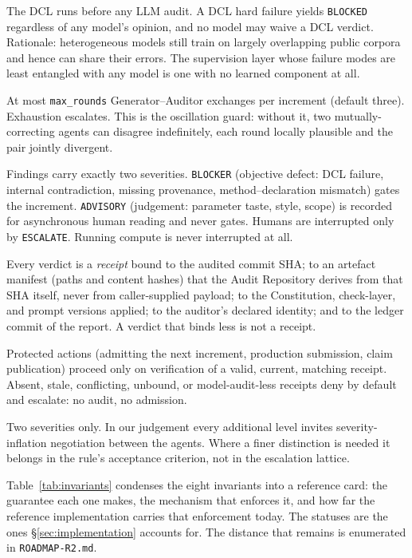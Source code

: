 \documentclass[11pt,letterpaper]{article}
\newcommand{\invariant}[1]{\textbf{I#1}}
\begin{document}
\begin{description}[itemsep=2pt,topsep=3pt]
  \item[\invariant{4} --- Determinism first.] The DCL runs before any LLM audit. A DCL hard failure yields \texttt{BLOCKED} regardless of any model's opinion, and no model may waive a DCL verdict. Rationale: heterogeneous models still train on largely overlapping public corpora and hence can share their errors. The supervision layer whose failure modes are least entangled with any model is one with no learned component at all.
  \item[\invariant{5} --- Bounded revision.] At most \texttt{max\_rounds} Generator--Auditor exchanges per increment (default three). Exhaustion escalates. This is the oscillation guard: without it, two mutually-correcting agents can disagree indefinitely, each round locally plausible and the pair jointly divergent.
  \item[\invariant{6} --- Graded interruption.] Findings carry exactly two severities. \texttt{BLOCKER} (objective defect: DCL failure, internal contradiction, missing provenance, method--declaration mismatch) gates the increment. \texttt{ADVISORY} (judgement: parameter taste, style, scope) is recorded for asynchronous human reading and never gates. Humans are interrupted only by \texttt{ESCALATE}. Running compute is never interrupted at all.
  \item[\invariant{7} --- Receipt binding.] Every verdict is a \emph{receipt} bound to the audited commit SHA; to an artefact manifest (paths and content hashes) that the Audit Repository derives from that SHA itself, never from caller-supplied payload; to the Constitution, check-layer, and prompt versions applied; to the auditor's declared identity; and to the ledger commit of the report. A verdict that binds less is not a receipt.
  \item[\invariant{8} --- Fail-closed admission.] Protected actions (admitting the next increment, production submission, claim publication) proceed only on verification of a valid, current, matching receipt. Absent, stale, conflicting, unbound, or model-audit-less receipts deny by default and escalate: no audit, no admission.
\end{description}

Two severities only. In our judgement every additional level invites severity-inflation negotiation between the agents. Where a finer distinction is needed it belongs in the rule's acceptance criterion, not in the escalation lattice.

Table~\ref{tab:invariants} condenses the eight invariants into a reference card: the guarantee each one makes, the mechanism that enforces it, and how far the reference implementation carries that enforcement today. The statuses are the ones \S\ref{sec:implementation} accounts for. The distance that remains is enumerated in \texttt{ROADMAP-R2.md}.
\end{document}

